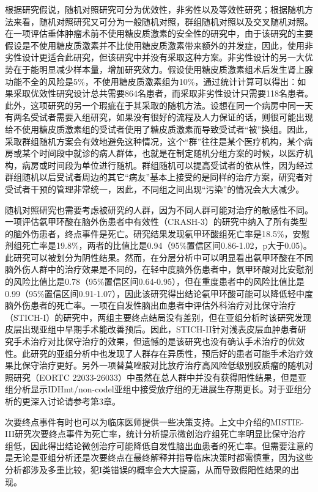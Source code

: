 \documentclass[
  chinese-hans,
  letterpaper,
  DIV=11,
  numbers=noendperiod]{scrreprt}
\begin{document}
根据研究假说，随机对照研究可分为优效性，非劣性以及等效性研究；根据随机方法来看，随机对照研究又可分为一般随机对照，群组随机对照以及交叉随机对照。在一项评估垂体肿瘤术前不使用糖皮质激素的安全性的研究中，由于该研究的主要假设是不使用糖皮质激素并不比使用糖皮质激素带来额外的并发症，因此，使用非劣性设计更适合此研究，但该研究中并没有采取这种方案。非劣性设计的另一大优势在于能明显减少样本量，增加研究效力。假设使用糖皮质激素组术后发生肾上腺功能不全的风险是5\%，不使用糖皮质激素组为10\%，通过统计计算可以得出：如果采取优效性研究设计总共需要864名患者，而采取非劣性设计只需要118名患者。此外，这项研究的另一个瑕疵在于其采取的随机方法。设想在同一个病房中同一天有两名受试者需要入组研究，如果没有很好的流程及人力保证的话，则很可能出现给不使用糖皮质激素组的受试者使用了糖皮质激素而导致受试者``被''换组。因此，采取群组随机方案会有效地避免这种情况，这个``群''往往是某个医疗机构，某个病房或某个时间段中就诊的病人群体，也就是在制定随机分组方案的时候，以医疗机构，病房或时间段为单位进行随机。群组随机可以提高受试者的依从性，因为经过群组随机以后受试者周边的其它``病友''基本上接受的是同样的治疗方案，研究者对受试者干预的管理非常统一，因此，不同组之间出现``污染''的情况会大大减少。

随机对照研究也需要考虑被研究的人群，因为不同人群可能对治疗的敏感性不同。一项评估氨甲环酸在脑外伤患者中有效性（CRASH-3）的研究中纳入了所有类型的脑外伤患者，终点事件是死亡。研究结果发现氨甲环酸组死亡率是18.5\%，安慰剂组死亡率是19.8\%，两者的比值比是0.94（95\%置信区间0.86-1.02，p大于0.05)。此研究可以被划分为阴性结果。然而，在分层分析中可以明显看出氨甲环酸在不同脑外伤人群中的治疗效果是不同的，在轻中度脑外伤患者中，氨甲环酸对比安慰剂的风险比值比是0.78（95\%置信区间0.64-0.95），但在重度患者中的风险比值比是0.99（95\%置信区间0.91-1.07），因此该研究得出结论氨甲环酸可能可以降低轻中度脑外伤患者的死亡率。一项在自发性脑出血患者中评估外科治疗对比保守治疗（STICH-I）的研究中，两组主要终点结局没有差别，但在亚组分析时该研究发现皮层出现亚组中早期手术能改善预后。因此，STICH-II针对浅表皮层血肿患者研究手术治疗对比保守治疗的效果，但遗憾的是该研究也没有确认手术治疗的优效性。此研究的亚组分析中也发现了人群存在异质性，预后好的患者可能手术治疗效果比保守治疗更好。另外一项替莫唑胺对比放疗治疗高风险低级别胶质瘤的随机对照研究（EORTC
22033-26033）中虽然在总人群中并没有获得阳性结果，但是亚组分析显示IDHmt/non-codel亚组中接受放疗组的无进展生存期更长。对于亚组分析的更深入讨论请参考第3章。

次要终点事件有时也可以为临床医师提供一些决策支持。上文中介绍的MISTIE-III研究次要终点事件为死亡率，统计分析提示微创治疗组死亡率明显比保守治疗组低，因此得出结论微创治疗可能降低自发性脑出血患者的死亡率。但需要注意的是无论是亚组分析还是次要终点在最终解释并指导临床决策时都需慎重，因为这些分析都涉及多重比较，犯I类错误的概率会大大提高，从而导致假阳性结果的出现。
\end{document}
